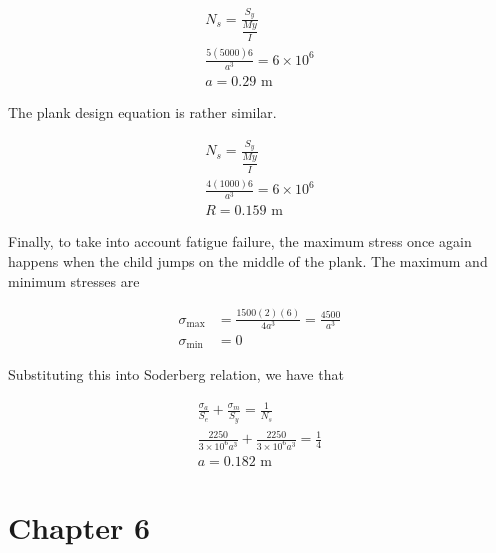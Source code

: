 \documentclass[
10pt,
a4paper,
openany,
svgnames,
]{book}
\begin{document}
\begin{exercises}
  \begin{align*}
    N_s = \frac{S_y}{\dfrac{My}{I}} \\
    \frac{5(5000)6}{ a^3} = 6 \times 10^6 \\
    a = 0.29 \text{ m}
  \end{align*}

  The plank design equation is rather similar.

  \begin{align*}
    N_s = \frac{S_y}{\dfrac{My}{I}} \\
    \frac{4(1000)6}{ a^3} = 6 \times 10^6 \\
    R = 0.159 \text{ m}
  \end{align*}

  Finally, to take into account fatigue failure, the maximum stress once again happens when the child jumps on the middle of the plank. The maximum and minimum stresses are

  \begin{align*}
    \sigma_{\max} &= \frac{1500(2)(6)}{4a^3} = \frac{4500}{a^3} \\
    \sigma_{\min} &= 0
  \end{align*}

  Substituting this into Soderberg relation, we have that

  \begin{align*}
    \frac{\sigma_a}{S_e} + \frac{\sigma_m}{S_y} = \frac{1}{N_s} \\
    \frac{2250}{3 \times 10^6 a^3} + \frac{2250}{3 \times 10^6 a^3} = \frac{1}{4} \\
    a = 0.182 \text{ m}
  \end{align*}
  
\end{exercises}

\section{Chapter 6}
\end{document}

